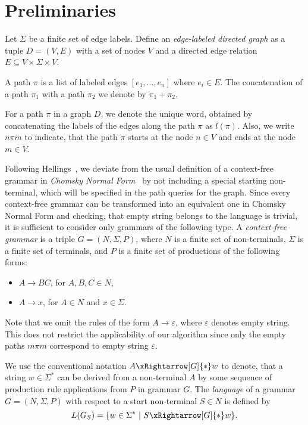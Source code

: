 \section{Preliminaries}
\label{section_preliminaries}

Let $\Sigma$ be a finite set of edge labels. Define an \emph{edge-labeled directed graph} as a tuple \mbox{$D = (V, E)$} with a set of nodes $V$ and a directed edge relation \mbox{$E \subseteq V \times \Sigma \times V$}.

A path $\pi$ is a list of labeled edges $[e_1,\ldots,e_n]$ where $e_i \in E$. The concatenation of a path $\pi_1$ with a path $\pi_2$ we denote by $\pi_1 + \pi_2$.

For a path $\pi$ in a graph $D$, we denote the unique word, obtained by concatenating the labels of the edges along the path $\pi$ as \mbox{$l(\pi)$}. Also, we write \mbox{$n \pi m$} to indicate, that the path $\pi$ starts at the node \mbox{$n \in V$} and ends at the node \mbox{$m \in V$}.

Following Hellings~\cite{hellingsRelational}, we deviate from the usual definition of a context-free grammar in \emph{Chomsky Normal Form}~\cite{chomsky} by not including a special starting non-terminal, which will be specified in the path queries for the graph. Since every context-free grammar can be transformed into an equivalent one in Chomsky Normal Form and checking, that empty string belongs to the language is trivial, it is sufficient to consider only grammars of the following type. A \emph{context-free grammar} is a triple \mbox{$G = (N, \Sigma, P)$}, where $N$ is a finite set of non-terminals, $\Sigma$ is a finite set of terminals, and $P$ is a finite set of productions of the following forms:

\begin{itemize}
    \item $A \rightarrow B C$, for $A,B,C \in N$,
    \item $A \rightarrow x$, for $A \in N$ and $x \in \Sigma$.   
\end{itemize}

Note that we omit the rules of the form \mbox{$A \rightarrow \varepsilon$}, where $\varepsilon$ denotes empty string. This does not restrict the applicability of our algorithm since only the empty paths \mbox{$m \pi m$} correspond to empty string $\varepsilon$.

We use the conventional notation \mbox{$A \xRightarrow[G]{*} w$} to denote, that a string \mbox{$w \in \Sigma^*$} can be derived from a non-terminal $A$ by some sequence of production rule applications from $P$ in grammar $G$. The \emph{language} of a grammar \mbox{$G = (N,\Sigma,P)$} with respect to a start non-terminal \mbox{$S \in N$} is defined by $$L(G_S) = \{w \in \Sigma^*~|~S \xRightarrow[G]{*} w\}.$$

